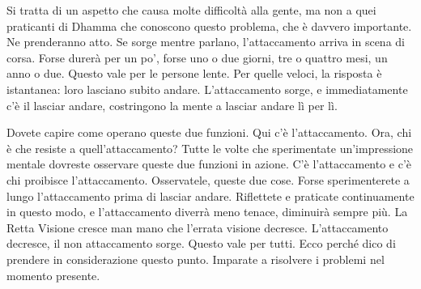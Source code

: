 Si tratta di un aspetto che causa molte difficoltà alla gente, ma non a
quei praticanti di Dhamma che conoscono questo problema, che è davvero
importante. Ne prenderanno atto. Se sorge mentre parlano,
l'attaccamento arriva in scena di corsa. Forse durerà per un po', forse
uno o due giorni, tre o quattro mesi, un anno o due. Questo vale per le
persone lente. Per quelle veloci, la risposta è istantanea: loro
lasciano subito andare. L'attaccamento sorge, e immediatamente c'è il
lasciar andare, costringono la mente a lasciar andare lì per lì.

Dovete capire come operano queste due funzioni. Qui c'è l'attaccamento.
Ora, chi è che resiste a quell'attaccamento? Tutte le volte che
sperimentate un'impressione mentale dovreste osservare queste due
funzioni in azione. C'è l'attaccamento e c'è chi proibisce
l'attaccamento. Osservatele, queste due cose. Forse sperimenterete a
lungo l'attaccamento prima di lasciar andare. Riflettete e praticate
continuamente in questo modo, e l'attaccamento diverrà meno tenace,
diminuirà sempre più. La Retta Visione cresce man mano che l'errata
visione decresce. L'attaccamento decresce, il non attaccamento sorge.
Questo vale per tutti. Ecco perché dico di prendere in considerazione
questo punto. Imparate a risolvere i problemi nel momento presente.

